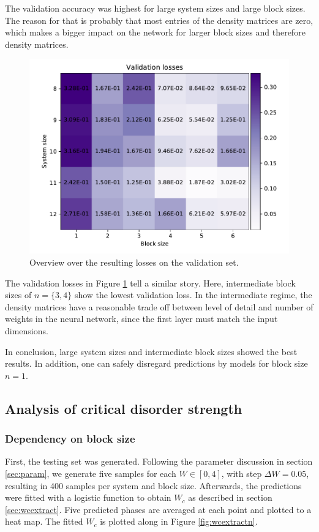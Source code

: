 \documentclass[reprint,amsmath,amssymb,aps,prb]{revtex4-2}
\begin{document}
The validation accuracy was highest for large system sizes and large block sizes. The reason for that is probably that most entries of the density matrices are zero, which makes a bigger impact on the network for larger block sizes and therefore density matrices.
\begin{figure}
	\centering
	\includegraphics[width=\linewidth]{../results/accuracy_loss_epochs/all_validation_losses}
	\caption{Overview over the resulting losses on the validation set.}
	\label{fig:all_validation_accuracy}
\end{figure}

The validation losses in Figure \ref{fig:all_validation_accuracy} tell a similar story. Here, intermediate block sizes of $n=\{3, 4\}$ show the lowest validation loss. In the intermediate regime, the density matrices have a reasonable trade off between level of detail and number of weights in the neural network, since the first layer must match the input dimensions.

In conclusion, large system sizes and intermediate block sizes showed the best results. In addition, one can safely disregard predictions by models for block size $n=1$.

\subsection{Analysis of critical disorder strength}
\subsubsection{Dependency on block size}
First, the testing set was generated. Following the parameter discussion in section \ref{sec:param}, we generate five samples for each $W\in\left[0,4\right]$, with step $\Delta W=0.05$, resulting in 400 samples per system and block size. Afterwards, the predictions were fitted with a logistic function to obtain $W_c$ as described in section \ref{sec:wcextract}.
Five predicted phases are averaged at each point and plotted to a heat map. The fitted $W_c$ is plotted along in Figure \ref{fig:wcextractn}.
\end{document}
